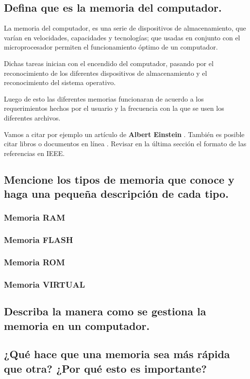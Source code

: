 \documentclass{article}
\begin{document}
\subsection{Defina que es la memoria del computador.}
La memoria del computador, es una serie de dispositivos de almacenamiento, que varían en velocidades, capacidades y tecnologías; que usadas en conjunto con el microprocesador permiten el funcionamiento óptimo de un computador. 

Dichas tareas inician con el encendido del computador, pasando por el reconocimiento de los diferentes dispositivos de almacenamiento y el reconocimiento del sistema operativo.

Luego de esto las diferentes memorias funcionaran de acuerdo a los requerimientos hechos por el usuario y la frecuencia con la que se usen los diferentes archivos.

Vamos a citar por ejemplo un artículo de \textbf{Albert Einstein} \cite{einstein}.
También es posible citar libros \cite{dirac} o documentos en línea \cite{knuthwebsite}.
Revisar en la última sección el formato de las referencias en IEEE.

\subsection{Mencione los tipos de memoria que conoce y haga una pequeña descripción de cada tipo.}
\subsubsection{Memoria RAM}
\subsubsection{Memoria FLASH}
\subsubsection{Memoria ROM}
\subsubsection{Memoria VIRTUAL}
\subsection{Describa la manera como se gestiona la memoria en un computador.}

\subsection{¿Qué hace que una memoria sea más rápida que otra? ¿Por qué esto es importante?}
\newpage
\end{document}
